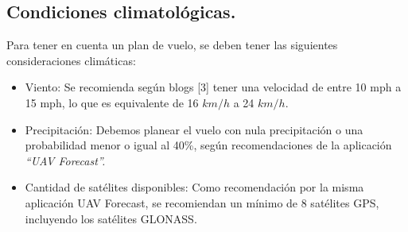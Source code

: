 \subsection{Condiciones climatológicas.}
Para tener en cuenta un plan de vuelo, se deben tener las siguientes consideraciones climáticas:
\begin{itemize}
	\item Viento: Se recomienda según blogs [3] tener una velocidad de entre 10 mph a 15 mph, lo que es equivalente de 16 $km/h$ a 24 $km/h$.
	\item Precipitación: Debemos planear el vuelo con nula precipitación o una probabilidad menor o igual al 40\%, según recomendaciones de la aplicación \textit{“UAV Forecast”.}
	\item Cantidad de satélites disponibles: Como recomendación por la misma aplicación UAV Forecast, se recomiendan un mínimo de 8 satélites GPS, incluyendo los satélites GLONASS.
\end{itemize}


